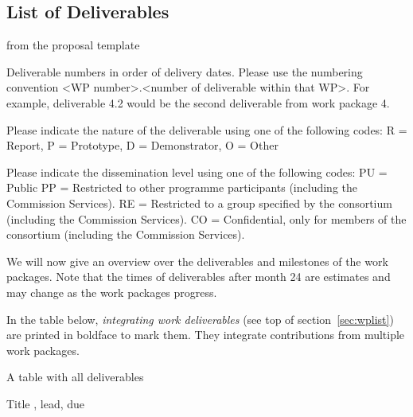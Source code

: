 \subsection{List of Deliverables}\label{sec:deliverables}

\begin{todo}{from the proposal template}
\begin{compactenum}
\item Deliverable numbers in order of delivery dates. Please use the numbering convention <WP number>.<number of deliverable within
that WP>. For example, deliverable 4.2 would be the second deliverable from work package 4.
\item Please indicate the nature of the deliverable using one of the following codes:
R = Report, P = Prototype, D = Demonstrator, O = Other
\item Please indicate the dissemination level using one of the following codes:
PU = Public
PP = Restricted to other programme participants (including the Commission Services).
RE = Restricted to a group specified by the consortium (including the Commission Services).
CO = Confidential, only for members of the consortium (including the Commission Services).
\end{compactenum}
\end{todo}
We will now give an overview over the deliverables and milestones of the work
packages. Note that the times of deliverables after month 24 are estimates and may change
as the work packages progress.

In the table below, \emph{integrating work deliverables} (see top of
section~\ref{sec:wplist}) are printed in boldface to mark them. They integrate
contributions from multiple work packages.

{\footnotesize{}}


{\color{red} A table with all deliverables}

Title , lead, due

